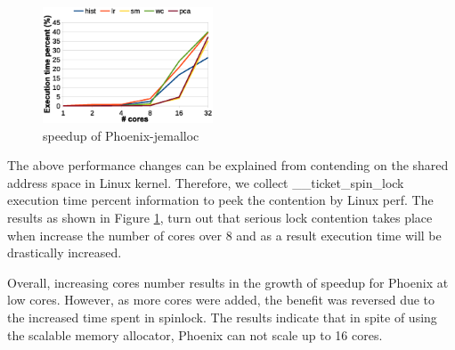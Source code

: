 \begin{figure}[!h!t]  
	\centering
	\includegraphics[width=0.45\textwidth]{eps/phoenix_spinlock_jemalloc.eps}
	\caption{speedup of Phoenix-jemalloc}
	\label{fig:phoenix:spinlock:jemalloc}
\end{figure}
The above performance changes can be explained from contending on the shared address space in Linux kernel.
Therefore, we collect \_\_ticket\_spin\_lock execution time percent information to peek the contention by Linux perf.
The results as shown in Figure \ref{fig:phoenix:spinlock:jemalloc}, turn out that serious lock contention takes place when increase the number of cores over 8 and as a result execution time will be drastically increased.



Overall, increasing cores number results in the growth of speedup for Phoenix at low cores.
However, as more cores were added, the benefit was reversed due to the increased time spent in spinlock.
The results indicate that in spite of using the scalable memory allocator, Phoenix can not scale up to 16 cores.




